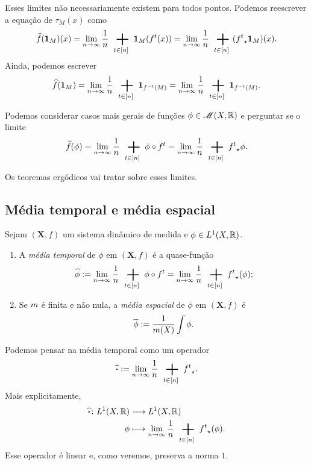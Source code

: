 Esses limites não necessariamente existem para todos pontos. Podemos reescrever a equação de $\tau_M(x)$ como
	\begin{equation*}
	\widehat{f}(\idc_M)(x) = \lim_{n \to \infty} \frac{1}{n} \sum_{t \in [n]} \idc_M(f^t(x)) = \lim_{n \to \infty} \frac{1}{n} \sum_{t \in [n]} ({f^t}\emp \idc_M) (x).
	\end{equation*}
 Ainda, podemos escrever
	\begin{equation*}
	\widehat{f}(\idc_M) = \lim_{n \to \infty} \frac{1}{n} \sum_{t \in [n]} \idc_{f^{-t}(M)} = \lim_{n \to \infty} \frac{1}{n} \sum_{t \in [n]} \idc_{f^{-t}(M)}.
	\end{equation*}

Podemos considerar casos mais gerais de funções $\phi \in \mathscr{M}(X,\mathbb{R})$ e perguntar se o limite
	\begin{equation*}
	\widehat{f}(\phi) = \lim_{n \to \infty} \frac{1}{n} \sum_{t \in [n]} \phi \circ f^t = \lim_{n \to \infty} \frac{1}{n} \sum_{t \in [n]} {f^t}\emp \phi.
	\end{equation*}

Os teoremas ergódicos vai tratar sobre esses limites.

\subsection{Média temporal e média espacial}

\begin{definition}
Sejam $(\bm X,f)$ um sistema dinâmico de medida e $\phi \in L^1(X,\mathbb{R})$.
	\begin{enumerate}
	\item A \emph{média temporal} de $\phi$ em $(\bm X,f)$ é a quase-função
		\begin{equation*}
		\widehat{\phi} := \lim_{n \to \infty} \frac{1}{n} \sum_{t \in [n]} \phi \circ f^t = \lim_{n \to \infty} \frac{1}{n} \sum_{t \in [n]} {f^t}\emp(\phi);
		\end{equation*}

	\item Se $m$ é finita e não nula, a \emph{média espacial} de $\phi$ em $(\bm X,f)$ é
		\begin{equation*}
		\overline{\phi} := \frac{1}{m(X)} \int \phi.
		\end{equation*}
	\end{enumerate}
\end{definition}

Podemos pensar na média temporal como um operador
	\begin{equation*}
	\widehat{\var} := \lim_{n \to \infty} \frac{1}{n} \sum_{t \in [n]} {f^t}\emp.
	\end{equation*}
Mais explicitamente,
	\begin{align*}
	\func{\widehat{\var}}{L^1(X,\R)}{L^1(X,\R)}{\phi}{\lim_{n \to \infty} \frac{1}{n} \sum_{t \in [n]} {f^t}\emp(\phi)}.
	\end{align*}
Esse operador é linear e, como veremos, preserva a norma $1$.

